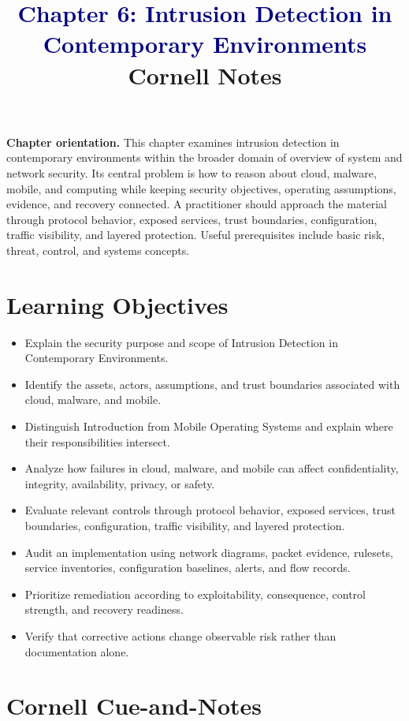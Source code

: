 \documentclass[11pt]{article}
\title{\textcolor{Navy}{Chapter 6: Intrusion Detection in Contemporary Environments}\\[2mm]\large Cornell Notes}
\author{}
\date{}
\begin{document}
\maketitle
\thispagestyle{fancy}
\vspace{-1.5em}
\begin{orientationbox}
\textbf{Chapter orientation.} This chapter examines intrusion detection in contemporary environments within the broader domain of overview of system and network security. Its central problem is how to reason about cloud, malware, mobile, and computing while keeping security objectives, operating assumptions, evidence, and recovery connected. A practitioner should approach the material through protocol behavior, exposed services, trust boundaries, configuration, traffic visibility, and layered protection. Useful prerequisites include basic risk, threat, control, and systems concepts.
\end{orientationbox}
\section*{Learning Objectives}
\begin{itemize}
\item Explain the security purpose and scope of Intrusion Detection in Contemporary Environments.
\item Identify the assets, actors, assumptions, and trust boundaries associated with cloud, malware, and mobile.
\item Distinguish Introduction from Mobile Operating Systems and explain where their responsibilities intersect.
\item Analyze how failures in cloud, malware, and mobile can affect confidentiality, integrity, availability, privacy, or safety.
\item Evaluate relevant controls through protocol behavior, exposed services, trust boundaries, configuration, traffic visibility, and layered protection.
\item Audit an implementation using network diagrams, packet evidence, rulesets, service inventories, configuration baselines, alerts, and flow records.
\item Prioritize remediation according to exploitability, consequence, control strength, and recovery readiness.
\item Verify that corrective actions change observable risk rather than documentation alone.
\end{itemize}
\section*{Cornell Cue-and-Notes}
\end{document}
